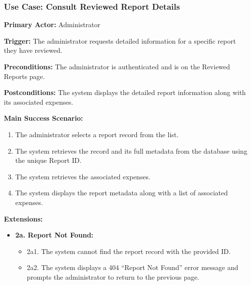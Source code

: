 \subsubsection{\textbf{Use Case: Consult Reviewed Report Details}}

\textbf{Primary Actor:} Administrator

\textbf{Trigger:} The administrator requests detailed information for a specific report they have reviewed.

\textbf{Preconditions:} The administrator is authenticated and is on the Reviewed Reports page.

\textbf{Postconditions:} The system displays the detailed report information along with its associated expenses.

\vspace{0.5cm}

\textbf{Main Success Scenario:}

\begin{enumerate} [leftmargin=0.75cm, noitemsep]
\item The administrator selects a report record from the list.
\item The system retrieves the record and its full metadata from the database using the unique Report ID.
\item The system retrieves the associated expenses.
\item The system displays the report metadata along with a list of associated expenses.
\end{enumerate}

\vspace{0.3cm}

\textbf{Extensions:}

\begin{itemize} [label={}, leftmargin=0.75cm, noitemsep]

    \item \textbf{2a. Report Not Found:}
    \begin{itemize} [label={}, leftmargin=0.75cm, noitemsep]
        \item 2a1. The system cannot find the report record with the provided ID.
        \item 2a2. The system displays a 404 ``Report Not Found'' error message and prompts the administrator to return to the previous page.
    \end{itemize}

\end{itemize}

\vspace{0.3cm}
